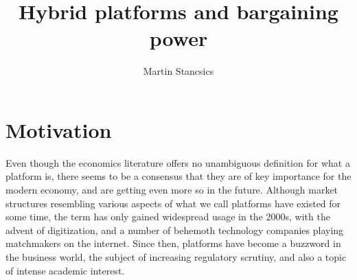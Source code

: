 \documentclass[a4paper]{article}
\title{Hybrid platforms and bargaining power}
\author{Martin Stancsics}
\begin{document}
\maketitle

\begin{abstract}
\end{abstract}


\section{Motivation}

Even though the economics literature offers no unambiguous definition for what a platform is, there seems to be a consensus that they are of key importance for the modern economy, and are getting even more so in the future.
Although market structures resembling various aspects of what we call platforms have existed for some time, the term has only gained widespread usage in the 2000s, with the advent of digitization, and a number of behemoth technology companies playing matchmakers on the internet.
Since then, platforms have become a buzzword in the business world, the subject of increasing regulatory scrutiny, and also a topic of intense academic interest.
\end{document}
